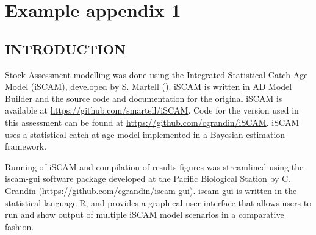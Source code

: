 \documentclass[11pt]{book}\usepackage[]{graphicx}\usepackage[]{color}
\newcommand{\latex}{\LaTeX\xspace}
\begin{document}

\lfoot{Example \latex-knitr}



\def\beq{\vspace{-5ex} \begin{fleqn} \begin{equation}}
\def\eeq{\end{equation} \end{fleqn} \vspace{-5ex}}
\def\tabline{\vspace{2ex} \hrule \vspace{2ex}}
\def\newp{\vfill \break}

\clearpage

\chapter{Example appendix 1}
\label{chap:example.1}

\section{INTRODUCTION}

Stock Assessment modelling was done using the Integrated Statistical Catch Age Model (iSCAM), developed by S. Martell (\citet{martell2011}). iSCAM is written in AD Model Builder and the source code and documentation for the original iSCAM is available at \hyperref[https://github.com/smartell/iSCAM]{\color{blue}https://github.com/smartell/iSCAM}. Code for the version used in this assessment can be found at \hyperref[https://github.com/cgrandin/iSCAM]{\color{blue}https://github.com/cgrandin/iSCAM}. iSCAM uses a statistical catch-at-age model implemented in a Bayesian estimation framework.

Running of iSCAM and compilation of results figures was streamlined using the iscam-gui software package developed at the Pacific Biological Station by C. Grandin (\hyperref[https://github.com/cgrandin/iscam-gui]{\color{blue}https://github.com/cgrandin/iscam-gui}). iscam-gui is written in the statistical language R, and provides a graphical user interface that allows users to run and show output of multiple iSCAM model scenarios in a comparative fashion.
\end{document}
